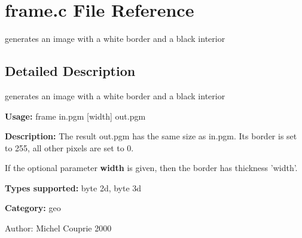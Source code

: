 \section{frame.c File Reference}
\label{frame_8c}
generates an image with a white border and a black interior  




\label{_details}
\subsection{Detailed Description}
generates an image with a white border and a black interior 

{\bf Usage:} frame in.pgm [width] out.pgm

{\bf Description:} The result out.pgm has the same size as in.pgm. Its border is set to 255, all other pixels are set to 0.

If the optional parameter {\bf width} is given, then the border has thickness 'width'.

{\bf Types supported:} byte 2d, byte 3d

{\bf Category:} geo

\begin{Desc}
\item[Author:]Michel Couprie 2000 \end{Desc}

